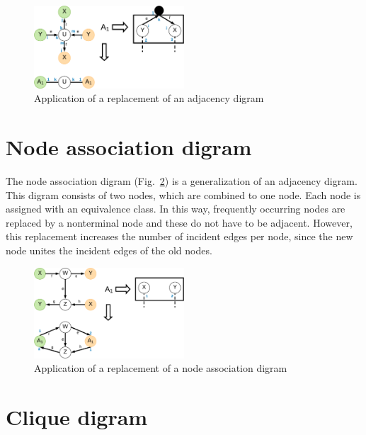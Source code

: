 \begin{figure}[h]
	\centering
	\includegraphics[width=0.5\textwidth]{chapters/imgConcept/adjacencyDigram}
	\caption{Application of a replacement of an adjacency digram}
	\label{fig:adjacencyDigram}
\end{figure}


\section{Node association digram}
\label{sec:associationDigram}


The node association digram (Fig.~\ref{fig:nodeAssociationDigram}) is a generalization of an adjacency digram.
This digram consists of two nodes, which are combined to one node. Each node is assigned with an equivalence class.
In this way, frequently occurring nodes are replaced by a nonterminal node and these do not have to be adjacent. However, this replacement increases the number of incident edges per node, since the new node unites the incident edges of the old nodes.

\begin{figure}[h]
	\centering
	\includegraphics[width=0.5\textwidth]{chapters/imgConcept/nodeAssociationDigram}
	\caption{Application of a replacement of a node association digram}
	\label{fig:nodeAssociationDigram}
\end{figure}


\section{Clique digram}
\label{sec:cliqueDigram}


